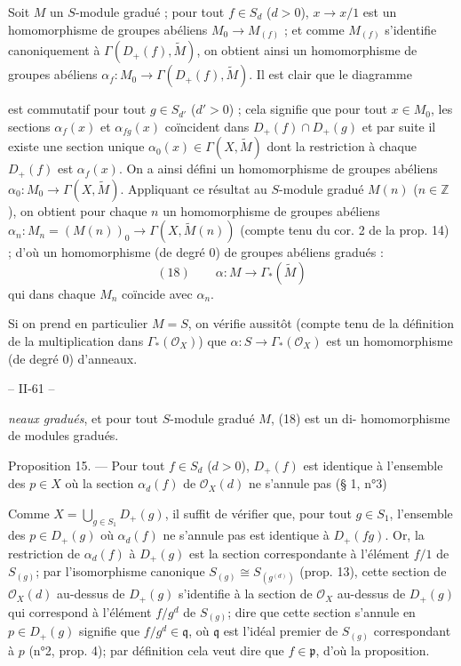 Soit $M$ un $S$-module gradué ; pour tout $f \in S_d$ ($d > 0$), $x \to x/1$ est un homomorphisme de groupes abéliens $M_0 \to M_{(f)}$ ; et comme $M_{(f)}$ s'identifie canoniquement à $\Gamma(D_+(f), \widetilde{M})$, on obtient ainsi un homomorphisme de groupes abéliens $\alpha_f : M_0 \to \Gamma(D_+(f), \widetilde{M})$. Il est clair que le diagramme


est commutatif pour tout $g \in S_{d'}$ ($d' > 0$) ; cela signifie que pour tout $x \in M_0$, les sections $\alpha_f(x)$ et $\alpha_{fg}(x)$ coïncident dans $D_+(f) \cap D_+(g)$ et par suite il existe une section unique $\alpha_0(x) \in \Gamma(X, \widetilde{M})$ dont la restriction à chaque $D_+(f)$ est $\alpha_f(x)$. On a ainsi défini un homomorphisme de groupes abéliens $\alpha_0 : M_0 \to \Gamma(X, \widetilde{M})$. Appliquant ce résultat au $S$-module gradué $M(n)$ ($n \in \mathbb{Z}$), on obtient pour chaque $n$ un homomorphisme de groupes abéliens $\alpha_n : M_n = (M(n))_0 \to \Gamma(X, \widetilde{M}(n))$ (compte tenu du cor. 2 de la prop. 14) ; d'où un homomorphisme (de degré 0) de groupes abéliens gradués :
$$(18) \qquad \alpha : M \to \Gamma_*(\widetilde{M})$$
qui dans chaque $M_n$ coïncide avec $\alpha_n$.

Si on prend en particulier $M=S$, on vérifie aussitôt (compte tenu de la définition de la multiplication dans $\Gamma_*(\mathcal{O}_X)$) que $\alpha : S \to \Gamma_*(\mathcal{O}_X)$ est un homomorphisme (de degré 0) d'anneaux.

\newpage


-- II-61 --

\emph{neaux gradués}, et pour tout $S$-module gradué $M$, (18) est un di-
homomorphisme de modules gradués.

\noindent Proposition 15. — Pour tout $f \in S_d$ ($d>0$), $D_+(f)$ est identique à l'ensemble des $p \in X$ où la section $\alpha_d(f)$ de $\mathcal{O}_X(d)$ ne s'annule pas (§ 1, n°3)

Comme $X = \bigcup_{g \in S_1} D_+(g)$, il suffit de vérifier que, pour tout $g \in S_1$, l'ensemble des $p \in D_+(g)$ où $\alpha_d(f)$ ne s'annule pas est identique à $D_+(fg)$. Or, la restriction de $\alpha_d(f)$ à $D_+(g)$ est la section correspondante à l'élément $f/1$ de $S_{(g)}$; par l'isomorphisme canonique $S_{(g)} \cong S_{(g^{(d)})}$ (prop. 13), cette section de $\mathcal{O}_X(d)$ au-dessus de $D_+(g)$ s'identifie à la section de $\mathcal{O}_X$ au-dessus de $D_+(g)$ qui correspond à l'élément $f/g^d$ de $S_{(g)}$; dire que cette section s'annule en $p \in D_+(g)$ signifie que $f/g^d \in \mathfrak{q}$, où $\mathfrak{q}$ est l'idéal premier de $S_{(g)}$ correspondant à $p$ (n°2, prop. 4); par définition cela veut dire que $f \in \mathfrak{p}$, d'où la proposition.

